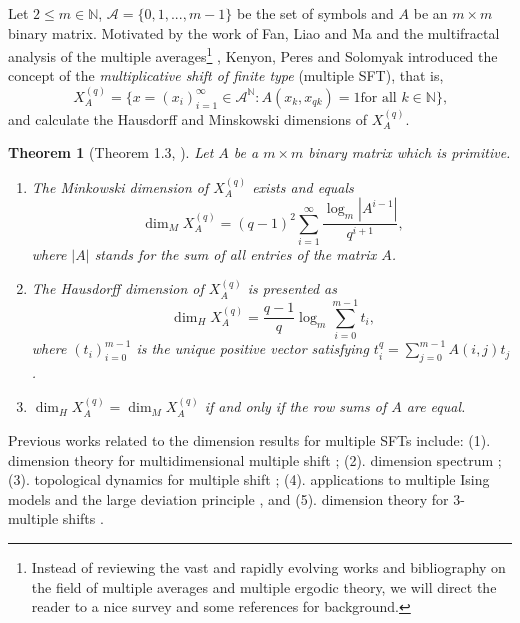 \documentclass{amsart}
\newtheorem{theorem}{Theorem}[section]
\theoremstyle{definition}
\numberwithin{equation}{section}%
\begin{document}
Let $2\leq m\in \mathbb{N}$, $\mathcal{A}=\{0, 1, ..., m-1\}$ be the set of symbols and $A$ be an $m\times m$ binary matrix. Motivated by the work of Fan, Liao and Ma \cite{fan2012level} and the multifractal analysis of the multiple averages\footnote{Instead of reviewing the vast and rapidly evolving works and bibliography on the field of multiple averages and multiple ergodic theory, we will direct
the reader to a nice survey and some references for background.} \cite{fan2014some}, Kenyon, Peres and Solomyak \cite{kenyon2012hausdorff} introduced the concept of the \emph{multiplicative shift of finite type} (multiple SFT), that is, 
\begin{equation}
X_{A}^{(q)}=\{x=(x_i)_{i=1}^\infty\in \mathcal{A}^{\mathbb{N}}:A(x_{k},x_{qk})=1\text{
for all }k\in \mathbb{N}\}\text{,}
\end{equation}
and calculate the Hausdorff and Minskowski dimensions of $X_{A}^{(q)}$.

\begin{theorem}[Theorem 1.3, \cite{kenyon2012hausdorff}]
Let $A$ be a $m\times m$ binary matrix which is primitive. 
\begin{enumerate}
\item The Minkowski dimension of $X_{A}^{(q)}$ exists and equals 
\begin{equation}
\dim _{M}X_{A}^{(q)}=(q-1)^{2}\sum_{i=1}^{\infty }\frac{\log _{m}\left\vert
A^{i-1}\right\vert }{q^{i+1}}\text{,}  \label{5}
\end{equation}
where $\left\vert A\right\vert $ stands for the sum of all entries of the matrix $A$.

\item The Hausdorff dimension of $X_{A}^{(q)}$ is presented as 
\begin{equation}
\dim _{H}X_{A}^{(q)}=\frac{q-1}{q}\log _{m}\sum_{i=0}^{m-1}t_{i}\text{,}
\end{equation}
where $(t_{i})_{i=0}^{m-1}$ is the unique positive vector satisfying $t_{i}^{q}=\sum_{j=0}^{m-1}A(i,j)t_{j}$.

\item $\dim_{H}X_{A}^{(q)}=\dim_{M}X_{A}^{(q)}$ if and only if the row sums of $A$ are equal.
\end{enumerate}
\end{theorem}

Previous works related to the dimension results for multiple SFTs include:
(1). dimension theory for multidimensional multiple shift \cite{ban2024hausdorff, brunet2021dimensions, brunet2022contribution}; (2).
dimension spectrum \cite{fan2021multifractal, fan2011multifractal, fan2016multifractal,
peres2014dimensions, peres2012dimension}; (3). topological dynamics for multiple shift \cite{ban2022topologically}; (4). applications to multiple Ising models and the large deviation principle \cite{ carinci2012nonconventional,
chatterjee2016nonlinear,chazottes2014thermodynamic,kifer2015lectures,kifer2014nonconventionallarge}, and (5). dimension theory for $3$-multiple shifts \cite{ban2019pattern}.
\end{document}
